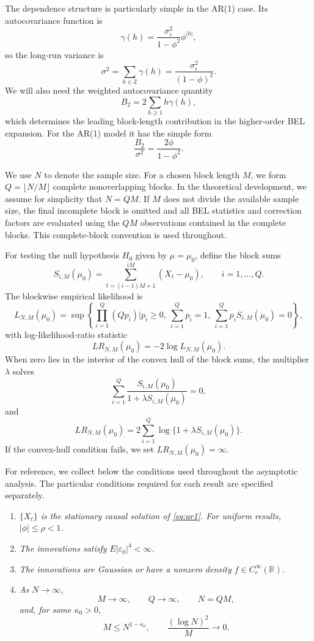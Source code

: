 \documentclass[12pt]{article}
\theoremstyle{remark}
\begin{document}
The dependence structure is particularly simple in the AR(1) case. Its
autocovariance function is
\begin{equation}
\gamma(h)
=
\frac{\sigma_\varepsilon^2}{1-\phi^2}\phi^{|h|},
\label{eq:ar1-acov}
\end{equation}
so the long-run variance is
\[
\sigma^2
=
\sum_{h\in\mathbb Z}\gamma(h)
=
\frac{\sigma_\varepsilon^2}{(1-\phi)^2}.
\]
We will also need the weighted autocovariance quantity
\[
B_2
=
2\sum_{h\ge1}h\gamma(h),
\]
which determines the leading block-length contribution in the higher-order
BEL expansion. For the AR(1) model it has the simple form
\[
\frac{B_2}{\sigma^2}
=
\frac{2\phi}{1-\phi^2}.
\]

We use $N$ to denote the sample size. For a chosen block length $M$, we form
$Q=\lfloor N/M\rfloor$ complete nonoverlapping blocks. In the theoretical
development, we assume for simplicity that $N=QM$. If $M$ does not divide
the available sample size, the final incomplete block is omitted and all BEL
statistics and correction factors are evaluated using the $QM$ observations
contained in the complete blocks. This complete-block convention is used
throughout.

For testing the null hypothesis $H_0$ given by $\mu=\mu_0$, define the block sums
\[
S_{i,M}(\mu_0)
=
\sum_{t=(i-1)M+1}^{iM}(X_t-\mu_0),
\qquad i=1,\ldots,Q.
\]
The blockwise empirical likelihood is
\[
L_{N,M}(\mu_0)
=
\sup\left\{
\prod_{i=1}^Q(Qp_i)
\mathrel{\Big|}
p_i\ge0,\ 
\sum_{i=1}^Qp_i=1,\ 
\sum_{i=1}^Qp_iS_{i,M}(\mu_0)=0
\right\},
\]
with log-likelihood-ratio statistic
\[
LR_{N,M}(\mu_0)
=
-2\log L_{N,M}(\mu_0).
\]
When zero lies in the interior of the convex hull of the block sums, the
multiplier $\lambda$ solves
\[
\sum_{i=1}^Q
\frac{S_{i,M}(\mu_0)}
     {1+\lambda S_{i,M}(\mu_0)}
=
0,
\]
and
\[
LR_{N,M}(\mu_0)
=
2\sum_{i=1}^Q
\log\{1+\lambda S_{i,M}(\mu_0)\}.
\]
If the convex-hull condition fails, we set
$LR_{N,M}(\mu_0)=\infty$.

For reference, we collect below the conditions used throughout the asymptotic analysis. The particular conditions required for each result are specified separately.

\begin{enumerate}
[
label=\textnormal{(A\arabic*)},
ref=A\arabic*,
leftmargin=*,
itemsep=0.8ex
]

\item\label{cond:A1}
\textit{$\{X_t\}$ is the stationary causal solution of \eqref{eq:ar1}. For uniform
results, $|\phi|\le\rho<1$.}

\item\label{cond:A2}
\textit{The innovations satisfy $E|\varepsilon_0|^4<\infty$.}

\item\label{cond:A3}
\textit{The innovations are Gaussian or have a nonzero density
$f\in C_c^\infty(\mathbb R)$.}

\item\label{cond:A4}
\textit{As $N\to\infty$,}
\[
M\to\infty,
\qquad
Q\to\infty,
\qquad
N=QM,
\]
\textit{and, for some $\kappa_0>0$,}
\[
M\le N^{1-\kappa_0},
\qquad
\frac{(\log N)^2}{M}\to0.
\]

\end{enumerate}
\end{document}
